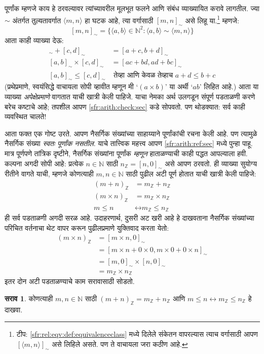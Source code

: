 \documentclass[11pt,a4paper,openany]{book}
\theoremstyle{definition}
\newtheorem{prob}{सराव}[chapter]
\newcommand{\Setabs}[2]{\{#1:#2\}}
\newcommand{\tuple}[1]{\langle #1\rangle}
\newcommand{\Nat}{\mathbb{N}}
\newcommand{\Int}{\mathbb{Z}}
\newcommand{\liff}{\mathbin{\leftrightarrow}}
\newcommand{\equivrep}[2]{[#1]_{#2}}
\newcommand{\Intequiv}{\sim}
\begin{document}
पूर्णांक म्हणजे काय हे ठरवल्यावर त्यांच्यावरील मूलभूत फलने आणि संबंध व्याख्यायित करावे लागतील. ज्या $\Intequiv$ अंतर्गत तुल्यतावर्गात $\tuple{m, n}$ हा घटक आहे, त्या वर्गासाठी $\equivrep{m, n}{\Intequiv}$ असे लिहू या.\footnote{टीप: \ref{sfr:rel:eqv:def:equivalenceclass} मध्ये दिलेले संकेतन वापरल्यास त्याच वर्गासाठी आपण $\equivrep{\tuple{m,n}}{\Intequiv}$ असे लिहिले असते. पण ते वाचायला जरा कठीण आहे.} म्हणजे:
	$$\equivrep{m, n}{\Intequiv} = \Setabs{\tuple{a, b} \in \Nat^2}{\tuple{a, b}\Intequiv \tuple{m, n}}$$
आता काही व्याख्या देऊ:
	\begin{align*}
		\equivrep{a, b}{\Intequiv} + \equivrep{c, d}{\Intequiv} &= \equivrep{a + c, b + d}{\Intequiv}\\
		\equivrep{a, b}{\Intequiv} \times \equivrep{c, d}{\Intequiv} &= \equivrep{a c + b  d, a  d + b c}{\Intequiv}\\
		\equivrep{a, b}{\Intequiv} \leq \equivrep{c, d}{\Intequiv} &\text{ तेव्हा आणि केवळ तेव्हाच }a + d \leq b + c
	\end{align*}
(प्रथेप्रमाणे, स्वयंसिद्धे वाचायला सोपी व्हावीत म्हणून मी `$(a \times b)$' या अर्थी `$ab$' लिहित आहे.) आता या व्याख्या \emph{अपेक्षेप्रमाणे} वागतात याची खात्री केली पाहिजे. याचा नेमका अर्थ उलगडून संपूर्ण पडताळणी करणे बरेच कष्टाचे आहे; तपशील आपण \ref{sfr:arith:check:sec} कडे सोपवतो. पण थोडक्यात: सर्व काही व्यवस्थित चालते!

आता फक्त एक गोष्ट उरते. आपण नैसर्गिक संख्यांच्या साहाय्याने
पूर्णांकांची रचना केली आहे. पण त्यामुळे नैसर्गिक संख्या \emph{स्वतः
पूर्णांक नसतील}. याचे तात्त्विक महत्त्व आपण \ref{sfr:arith:ref:sec} मध्ये
पुन्हा पाहू. मात्र पूर्णपणे तांत्रिक दृष्टीने, नैसर्गिक संख्यांना
पूर्णांक \emph{म्हणून} हाताळण्याची काही पद्धत आपल्याला हवी. कल्पना अगदी
सोपी आहे: प्रत्येक $n \in \Nat$ साठी $n_\Int = \equivrep{n, 0}{\Intequiv}$
असे आपण ठरवतो. ही व्याख्या सुयोग्य रीतीने वागते याची, म्हणजे कोणत्याही
$m, n \in \Nat$ साठी पुढील अटी पूर्ण होतात याची खात्री केली पाहिजे:
\begin{align*}
	(m + n)_\Int &= m_\Int + n_\Int\\
	(m \times n)_\Int &= m_\Int \times n_\Int\\
	m \leq n &\liff m_\Int \leq n_\Int
\end{align*}
ही सर्व पडताळणी अगदी सरळ आहे. उदाहरणार्थ, दुसरी अट खरी आहे हे
दाखवताना नैसर्गिक संख्यांच्या परिचित वर्तनाचा थेट वापर करून पुढीलप्रमाणे
युक्तिवाद करता येतो:
	\begin{align*}
		(m \times n)_\Int  &= \equivrep{m \times n, 0}{\Intequiv} \\
		&= \equivrep{m \times n + 0 \times 0, m \times 0 + 0 \times n}{\Intequiv} \\
		&= \equivrep{m, 0}{\Intequiv} \times \equivrep{n, 0}{\Intequiv} \\
		&= m_\Int \times n_\Int
	\end{align*}
इतर दोन अटी पडताळण्याचे काम सरावासाठी सोडतो.
\begin{prob}
	कोणत्याही $m, n \in \Nat$ साठी $(m + n)_\Int = m_\Int + n_\Int$ आणि $m \leq n \liff m_\Int \leq n_\Int$ हे दाखवा.
\end{prob}
\end{document}
